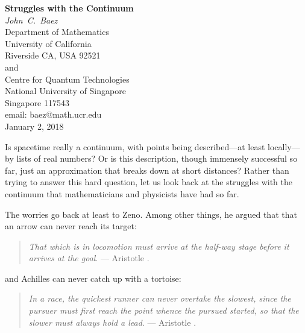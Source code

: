 \documentclass[12pt]{article}
\begin{document}


\begin{center}   
  {\bf Struggles with the Continuum \\}   
  \vspace{0.3cm}
  {\em John\ C.\ Baez \\}
  \vspace{0.3cm}
  {\small
 Department of Mathematics \\
    University of California \\
  Riverside CA, USA 92521 \\ and \\
 Centre for Quantum Technologies  \\
    National University of Singapore \\
    Singapore 117543  \\    } 
  \vspace{0.3cm}   
  {\small email:  baez@math.ucr.edu \\} 
  \vspace{0.3cm}   
  {\small {January 2, 2018}}
  \vspace{0.3cm}   
\end{center}   

Is spacetime really a continuum, with points being described---at least locally---by lists of  real numbers?  Or is this description, though immensely successful so far, just an approximation that breaks down at short distances?  Rather than trying to answer this hard question, let us look back at the struggles with the continuum that mathematicians and physicists have had so far.

The worries go back at least to Zeno.  Among other things, he argued that that an arrow can never reach its target:

\begin{quote}
\emph{That which is in locomotion must arrive at the half-way stage before it arrives at the goal}. ---  Aristotle \cite{AristotleZeno1}.
\end{quote}

\noindent
and Achilles can never catch up with a tortoise:

\begin{quote}
\emph{In a race, the quickest runner can never overtake the slowest, since the pursuer must first reach the point whence the pursued started, so that the slower must always hold a lead}. --- Aristotle \cite{AristotleZeno2}.
\end{quote}
\end{document}
